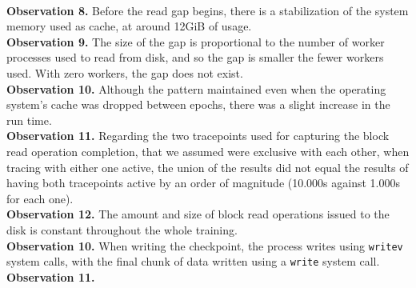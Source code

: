\documentclass[conference]{IEEEtran}
\begin{document}
\\
\textbf{Observation 8.} Before the read gap begins, there is a stabilization of the system memory used as cache, at around 12GiB of usage.
\\
\textbf{Observation 9.} The size of the gap is proportional to the number of worker processes used to read from disk, and so the gap is smaller the fewer workers used. With zero workers, the gap does not exist. 
\\
\textbf{Observation 10.} Although the pattern maintained even when the operating system's cache was dropped between epochs, there was a slight increase in the run time. 
\\
\textbf{Observation 11.} Regarding the two tracepoints used for capturing the block read operation completion, that we assumed were exclusive with each other, when tracing with either one active, the union of the results did not equal the results of having both tracepoints active by an order of magnitude (10.000s against 1.000s for each one).  
\\
\textbf{Observation 12.} The amount and size of block read operations issued to the disk is constant throughout the whole training.
\\
\textbf{Observation 10.} When writing the checkpoint, the process writes using \texttt{writev} system calls, with the final chunk of data written using a \texttt{write} system call.
\\
\textbf{Observation 11.} 

\end{document}
